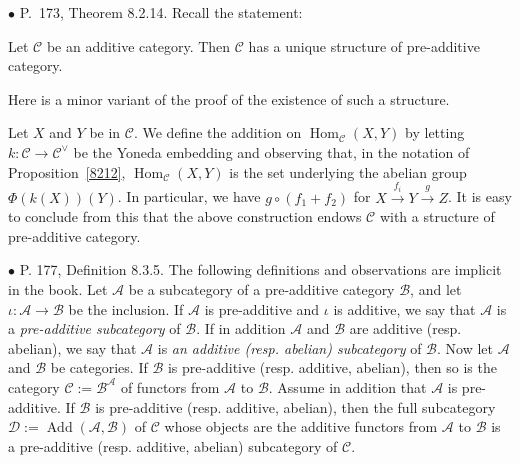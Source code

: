 \documentclass[12pt]{article}
\theoremstyle{remark}
\newcommand{\bu}{\bullet}
\newcommand{\n}{\noindent}
\newcommand{\cc}{\mathcal}
\newcommand{\C}{\mathcal C}
\newcommand{\xr}{\xrightarrow}
\newcommand{\pr}{Proposition}
\DeclareMathOperator{\Ad}{Add}
\DeclareMathOperator{\h}{Hom}
\begin{document}
\n$\bu$ P.~173, Theorem 8.2.14. Recall the statement: 

Let $\C$ be an additive category. Then $\C$ has a unique structure of pre-additive category. 

Here is a minor variant of the proof of the existence of such a structure. 

Let $X$ and $Y$ be in $\C$. We define the addition on $\h_\C(X,Y)$ by letting $k:\C\to\C^\vee$ be the Yoneda embedding and observing that, in the notation of \pr\ \ref{8212}, $\h_\C(X,Y)$ is the set underlying the abelian group $\Phi(k(X))(Y)$. In particular, we have $g\circ(f_1+f_2)$ for $X\xr{f_i}Y\xr gZ$. It is easy to conclude from this that the above construction endows $\C$ with a structure of pre-additive category. 


\n$\bu$ P. 177, Definition 8.3.5. The following definitions and observations are implicit in the book. Let $\cc A$ be a subcategory of a pre-additive category $\cc B$, and let $\iota:\cc A\to \cc B$ be the inclusion. If $\cc A$ is pre-additive and $\iota$ is additive, we say that $\cc A$ is a {\em pre-additive subcategory} of $\cc B$. If in addition $\cc A$ and $\cc B$ are additive (resp. abelian), we say that $\cc A$ is {\em an additive (resp. abelian) subcategory} of $\cc B$. Now let $\cc A$ and $\cc B$ be categories. If $\cc B$ is pre-additive (resp. additive, abelian), then so is the category $\cc C:=\cc B^\cc A$ of functors from $\cc A$ to $\cc B$. Assume in addition that $\cc A$ is pre-additive. If $\cc B$ is pre-additive (resp. additive, abelian), then the full subcategory $\cc D:=\Ad(\cc A,\cc B)$ of $\cc C$ whose objects are the additive functors from $\cc A$ to $\cc B$ is a pre-additive (resp. additive, abelian) subcategory of $\cc C$. 

\end{document}
